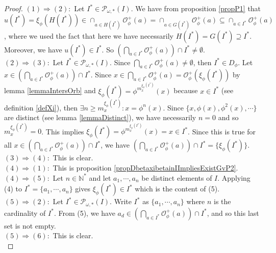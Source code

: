 \documentclass[a4paper,11pt]{article}
\theoremstyle{plain}
\theoremstyle{definition}
\theoremstyle{remark}
\begin{document}
\begin{proof}
$(1) \Rightarrow (2) :$ Let $I^* \in \mathcal{P}_{\omega,*}(I)$. We have from proposition \ref{propP1} that ${u(I^*) = \xi_\phi(H(I^*)) \in \cap_{a \in H(I^*)} \mathcal{O}^{+}_\phi(a) = \cap_{a \in G(I^*)} \mathcal{O}^{+}_\phi(a) \subseteq \cap_{a \in I^*} \mathcal{O}^{+}_\phi(a)}$, where we used the fact that here we have necessarily $H(I^*) = G(I^*) \supseteq I^*$. Moreover, we have $u(I^*) \in I^*$. So ${\left( \bigcap_{a \in I^*} \mathcal{O}^{+}_\phi(a) \right) \cap I^* \neq \emptyset}$. \\
$(2) \Rightarrow (3) :$ Let $I^* \in \mathcal{P}_{\omega,*}(I)$. Since $\bigcap_{a \in I^*} \mathcal{O}^{+}_\phi(a) \neq \emptyset$, then $I^* \in D_\phi$. Let $x \in \left( \bigcap_{a \in I^*} \mathcal{O}^{+}_\phi(a) \right) \cap I^*$.  Since $x \in \bigcap_{a \in I^*} \mathcal{O}^{+}_\phi(a) = \mathcal{O}^{+}_\phi(\xi_\phi(I^*))$ by lemma \ref{lemmaIntersOrb} and $\xi_\phi(I^*) = \phi^{m^{\xi_\phi(I^*)}_x}(x)$ because $x \in I^*$ (see definition \ref{defXi}), then $\exists n \geq m^{\xi_\phi(I^*)}_x : x = \phi^n(x)$. Since $\{x, \phi(x), \phi^2(x), \cdots\}$ are distinct (see lemma \ref{lemmaDistinct}), we have necessarily $n=0$ and so $m^{\xi_\phi(I^*)}_x = 0$. This implies $\xi_\phi(I^*) = \phi^{m^{\xi_\phi(I^*)}_x}(x) = x \in I^*$. Since this is true for all $x \in \left( \bigcap_{a \in I^*} \mathcal{O}^{+}_\phi(a) \right) \cap I^*$, we have $\left( \bigcap_{a \in I^*} \mathcal{O}^{+}_\phi(a) \right) \cap I^* = \{\xi_\phi(I^*)\}$. \\
$(3) \Rightarrow (4) :$ This is clear. \\
$(4) \Rightarrow (1) :$ This is proposition \ref{propDbetaxibetainIImpliesExistGvP2}. \\
$(4) \Rightarrow (5) :$ Let $n \in \mathbb{N}^*$ and let $a_1,\cdots,a_n$ be distinct elements of $I$. Applying (4) to $I^* = \{a_1,\cdots,a_n\}$ gives $\xi_\phi(I^*) \in I^*$ which is the content of (5). \\
$(5) \Rightarrow (2) :$ Let $I^* \in \mathcal{P}_{\omega,*}(I)$. Write $I^*$ as $\{a_1,\cdots,a_n\}$ where $n$ is the cardinality of $I^*$. From (5), we have $a_d \in \left( \bigcap_{a \in I^*} \mathcal{O}^{+}_\phi(a) \right) \cap I^*$, and so this last set is not empty. \\
$(5) \Rightarrow (6) :$ This is clear. \\

\end{proof}
\end{document}
